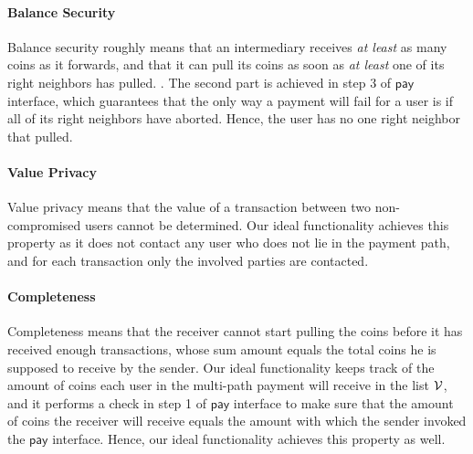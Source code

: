 \paragraph{Balance Security}
Balance security roughly means that an intermediary receives \emph{at least} as many coins as 
it forwards, and that it can pull its coins as soon as \emph{at least} one of its right 
neighbors has pulled.  .  The second part is achieved 
in step 3 of $\mathsf{pay}$ interface, which guarantees that the only way a payment will fail 
for a user is if all of its right neighbors have aborted. Hence, the user has no one right 
neighbor that pulled.


\paragraph{Value Privacy}
Value privacy means that the value of a transaction between two non-compromised users cannot 
be determined. Our ideal functionality achieves this property as it does not contact any user 
who does not lie in the payment path, and for each transaction only the involved parties are 
contacted. 

\paragraph{Completeness}
Completeness means that the receiver cannot start pulling the coins before it has received 
enough transactions, whose sum amount equals the total coins he is supposed to receive by 
the sender. Our ideal functionality keeps track of the amount of coins each user in the 
multi-path payment will receive in the list $\mathcal{V}$, and it performs a check in step 1 of 
$\mathsf{pay}$ interface to make sure that the amount of coins the receiver will receive equals 
the amount with which the sender invoked the $\mathsf{pay}$ interface. Hence, our ideal 
functionality achieves this property as well.

